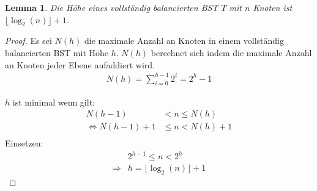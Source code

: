 \documentclass[a4paper,12pt]{article}
\begin{document}
\newtheorem{Lemma}{Lemma}[section]
\begin{Lemma} Die Höhe eines vollständig balancierten BST $T$ mit $n$ Knoten ist $ \lfloor \log_2{(n)} \rfloor + 1 $. 
\end{Lemma}
\begin{proof}
	
	Es sei $\mathit{N(h)}$ die maximale Anzahl an Knoten in einem vollständig balancierten BST mit Höhe $h$.
	$\mathit{N(h)}$  berechnet sich indem die maximale Anzahl an Knoten jeder Ebene aufaddiert wird.\\
	\begin{align*}
	 \mathit{N(h)} = \sum\limits_{i=0}^{h-1} 2^i = 2^h - 1 
	\end{align*}
								 
\noindent	$h$ ist minimal wenn gilt:\\
	\begin{align*}
	\mathit{N(h-1)} &< n \leq \mathit{N(h)}\\
	\Leftrightarrow \mathit{N(h-1)} + 1 &\leq n < \mathit{N(h)} + 1\\
	\end{align*}
	Einsetzen:\\
	\begin{align*}
	&2^{h - 1} \leq n < 2^h\\
	\Rightarrow & h =  \lfloor \log_2{(n)} \rfloor + 1
	\end{align*}
	
\end{proof}


\newpage


\end{document}

